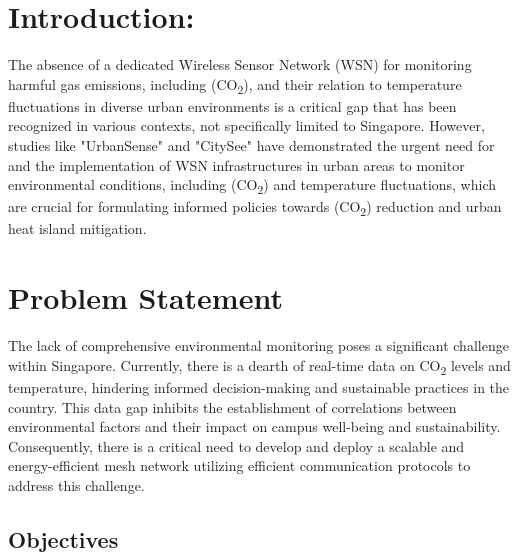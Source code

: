 \section{Introduction:}\label{sec:introduction}
The absence of a dedicated Wireless Sensor Network (WSN) for monitoring harmful gas emissions, including (CO\textsubscript{2}), and their relation to temperature fluctuations in diverse urban environments is a critical gap that has been recognized in various contexts, not specifically limited to Singapore. However, studies like "UrbanSense" \cite{Rainham2016A} and "CitySee" \cite{Liu2013CitySee} have demonstrated the urgent need for and the implementation of WSN infrastructures in urban areas to monitor environmental conditions, including (CO\textsubscript{2}) and temperature fluctuations, which are crucial for formulating informed policies towards (CO\textsubscript{2}) reduction and urban heat island mitigation.

\section{Problem Statement}\label{sec:problem_statement}
The lack of comprehensive environmental monitoring poses a significant challenge within Singapore. Currently, there is a dearth of real-time data on CO\textsubscript{2} levels and temperature, hindering informed decision-making and sustainable practices in the country. This data gap inhibits the establishment of correlations between environmental factors and their impact on campus well-being and sustainability. Consequently, there is a critical need to develop and deploy a scalable and energy-efficient mesh network utilizing efficient communication protocols to address this challenge. 

\subsection{Objectives}\label{sec:objectives}

